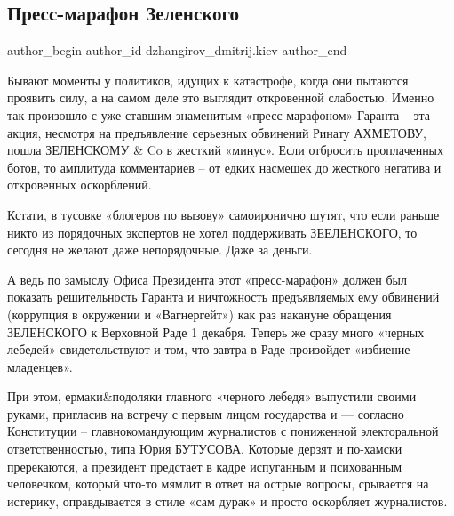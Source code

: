  
 
 
 
 
 
\subsection{Пресс-марафон Зеленского}
\label{sec:30_11_2021.fb.dzhangirov_dmitrij.kiev.1.press_marafon_zelenskogo}
 
\ifcmt
 author_begin
   author_id dzhangirov_dmitrij.kiev
 author_end
\fi

Бывают моменты у политиков, идущих к катастрофе, когда они пытаются проявить
силу, а на самом деле это выглядит откровенной слабостью. Именно так произошло
с уже ставшим знаменитым «пресс-марафоном» Гаранта – эта акция, несмотря на
предъявление серьезных обвинений Ринату АХМЕТОВУ, пошла ЗЕЛЕНСКОМУ \& Co в
жесткий «минус». Если отбросить проплаченных ботов, то амплитуда комментариев –
от едких насмешек до жесткого негатива и откровенных оскорблений.

Кстати, в тусовке «блогеров по вызову» самоиронично шутят, что если раньше
никто из порядочных экспертов не хотел поддерживать ЗЕЕЛЕНСКОГО, то сегодня не
желают даже непорядочные. Даже за деньги. 

А ведь по замыслу Офиса Президента этот «пресс-марафон» должен был показать
решительность Гаранта и ничтожность предъявляемых ему обвинений (коррупция в
окружении и «Вагнергейт») как раз накануне обращения ЗЕЛЕНСКОГО к Верховной
Раде 1 декабря. Теперь же сразу много «черных лебедей» свидетельствуют и том,
что завтра в Раде произойдет «избиение младенцев».

При этом, ермаки\&подоляки главного «черного лебедя» выпустили своими руками,
пригласив на встречу с первым лицом государства и — согласно Конституции –
главнокомандующим журналистов с пониженной электоральной ответственностью, типа
Юрия БУТУСОВА. Которые дерзят и по-хамски пререкаются, а президент предстает в
кадре испуганным и психованным человечком, который что-то мямлит в ответ на
острые вопросы, срывается на истерику, оправдывается в стиле «сам дурак» и
просто оскорбляет журналистов.

